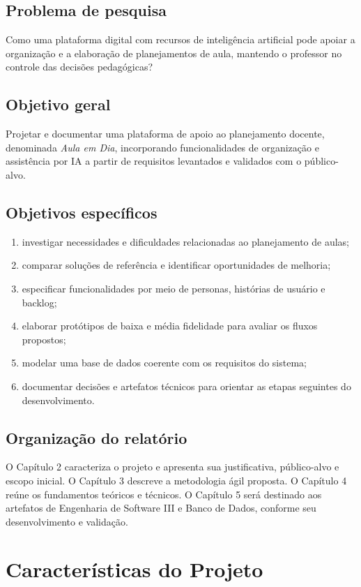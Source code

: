 \documentclass[12pt,a4paper,oneside]{report}
\begin{document}
\section{Problema de pesquisa}
Como uma plataforma digital com recursos de inteligência artificial pode apoiar a organização e a elaboração de planejamentos de aula, mantendo o professor no controle das decisões pedagógicas?

\section{Objetivo geral}
Projetar e documentar uma plataforma de apoio ao planejamento docente, denominada \textit{Aula em Dia}, incorporando funcionalidades de organização e assistência por IA a partir de requisitos levantados e validados com o público-alvo.

\section{Objetivos específicos}
\begin{enumerate}[label=\alph*)]
  \item investigar necessidades e dificuldades relacionadas ao planejamento de aulas;
  \item comparar soluções de referência e identificar oportunidades de melhoria;
  \item especificar funcionalidades por meio de personas, histórias de usuário e backlog;
  \item elaborar protótipos de baixa e média fidelidade para avaliar os fluxos propostos;
  \item modelar uma base de dados coerente com os requisitos do sistema;
  \item documentar decisões e artefatos técnicos para orientar as etapas seguintes do desenvolvimento.
\end{enumerate}

\section{Organização do relatório}
O Capítulo 2 caracteriza o projeto e apresenta sua justificativa, público-alvo e escopo inicial. O Capítulo 3 descreve a metodologia ágil proposta. O Capítulo 4 reúne os fundamentos teóricos e técnicos. O Capítulo 5 será destinado aos artefatos de Engenharia de Software III e Banco de Dados, conforme seu desenvolvimento e validação.

\chapter{Características do Projeto}
\end{document}
